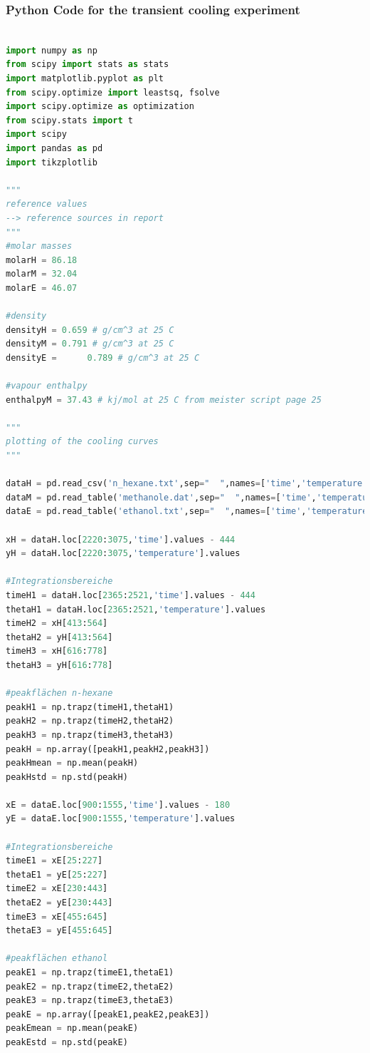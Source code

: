 \documentclass[a4paper,abstracton]{article}	                       %
\begin{document}
\subsubsection*{Python Code for the transient cooling experiment}
\begin{lstlisting}[language=Python]

import numpy as np
from scipy import stats as stats
import matplotlib.pyplot as plt
from scipy.optimize import leastsq, fsolve
import scipy.optimize as optimization
from scipy.stats import t
import scipy
import pandas as pd
import tikzplotlib

"""
reference values
--> reference sources in report 
"""
#molar masses
molarH = 86.18
molarM = 32.04 
molarE = 46.07

#density 
densityH = 0.659 # g/cm^3 at 25 C
densityM = 0.791 # g/cm^3 at 25 C
densityE =  	0.789 # g/cm^3 at 25 C

#vapour enthalpy
enthalpyM = 37.43 # kj/mol at 25 C from meister script page 25

"""
plotting of the cooling curves
"""

dataH = pd.read_csv('n_hexane.txt',sep="  ",names=['time','temperature'])
dataM = pd.read_table('methanole.dat',sep="  ",names=['time','temperature'])
dataE = pd.read_table('ethanol.txt',sep="  ",names=['time','temperature'])

xH = dataH.loc[2220:3075,'time'].values - 444
yH = dataH.loc[2220:3075,'temperature'].values 

#Integrationsbereiche
timeH1 = dataH.loc[2365:2521,'time'].values - 444
thetaH1 = dataH.loc[2365:2521,'temperature'].values 
timeH2 = xH[413:564]
thetaH2 = yH[413:564]
timeH3 = xH[616:778]
thetaH3 = yH[616:778]

#peakflächen n-hexane
peakH1 = np.trapz(timeH1,thetaH1)
peakH2 = np.trapz(timeH2,thetaH2)
peakH3 = np.trapz(timeH3,thetaH3)
peakH = np.array([peakH1,peakH2,peakH3])
peakHmean = np.mean(peakH)
peakHstd = np.std(peakH)

xE = dataE.loc[900:1555,'time'].values - 180
yE = dataE.loc[900:1555,'temperature'].values

#Integrationsbereiche
timeE1 = xE[25:227]
thetaE1 = yE[25:227]
timeE2 = xE[230:443]
thetaE2 = yE[230:443]
timeE3 = xE[455:645]
thetaE3 = yE[455:645]

#peakflächen ethanol
peakE1 = np.trapz(timeE1,thetaE1)
peakE2 = np.trapz(timeE2,thetaE2)
peakE3 = np.trapz(timeE3,thetaE3)
peakE = np.array([peakE1,peakE2,peakE3])
peakEmean = np.mean(peakE)
peakEstd = np.std(peakE)


\end{lstlisting}
\end{document}
